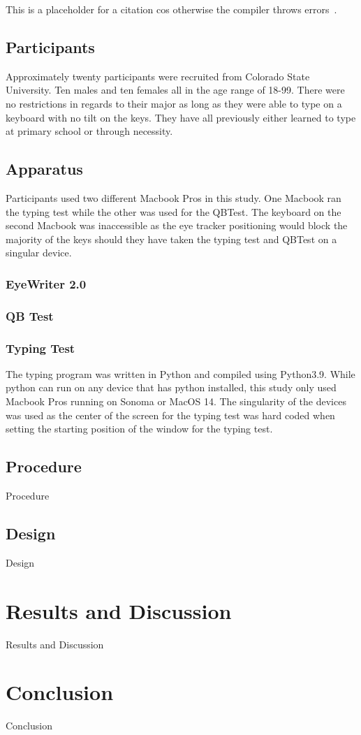 \documentclass[sigconf]{acmart}
\begin{document}
  This is a placeholder for a citation cos otherwise the compiler throws errors~\cite{AudioDistractionsAshley}.

  \subsection[short]{Participants}
  Approximately twenty participants were recruited from Colorado State University. Ten males and ten females all in the age range of 18-99. There were no %
  restrictions in regards to their major as long as they were able to type on a keyboard with no tilt on the keys.
  They have all previously either learned to type at primary school or through necessity.

  \subsection[short]{Apparatus}  %
  Participants used two different Macbook Pros in this study. One Macbook ran the typing test while the other was used for the QBTest. 
  The keyboard on the second Macbook was inaccessible as the eye tracker positioning would block the majority of the keys should they have 
  taken the typing test and QBTest on a singular device.

  \subsubsection{EyeWriter 2.0}
  \subsubsection{QB Test}
  \subsubsection{Typing Test}
  The typing program was written in Python and compiled using Python3.9. While python can run on any device that has python installed, this study only used Macbook Pros running on Sonoma or MacOS 14. The singularity of the devices was used as the center of the screen for the typing test was hard coded when setting the starting position of the window for the typing test. 

  \subsection[short]{Procedure}
  Procedure 

  \subsection[short]{Design}
  Design

\section{Results and Discussion}
  Results and Discussion

\section{Conclusion}
  Conclusion



\end{document}
